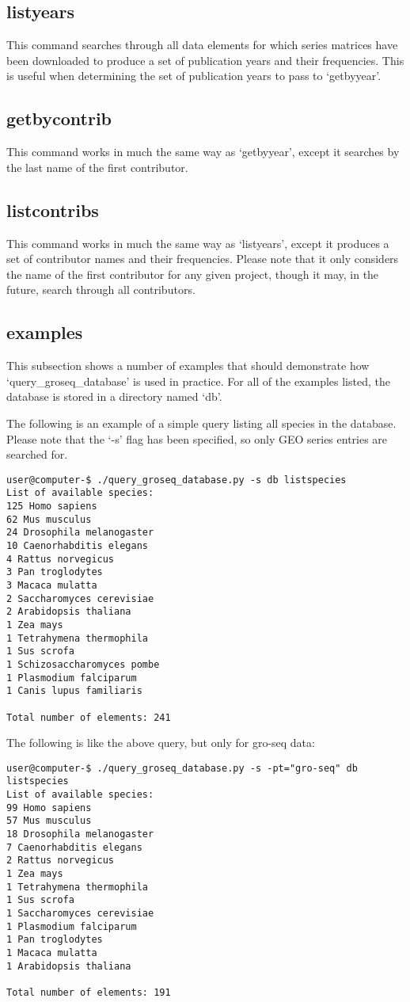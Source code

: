 \documentclass[12pt,letterpaper]{article}
\begin{document}
\subsection{listyears}
This command searches through all data elements for which series matrices have been downloaded to produce a set of publication years and their frequencies. 
This is useful when determining the set of publication years to pass to `getbyyear'.

\subsection{getbycontrib}
This command works in much the same way as `getbyyear', except it searches by the last name of the first contributor.

\subsection{listcontribs}
This command works in much the same way as `listyears', except it produces a set of contributor names and their frequencies. Please note that it only considers
the name of the first contributor for any given project, though it may, in the future, search through all contributors.

\subsection{examples}
This subsection shows a number of examples that should demonstrate how `query\_groseq\_database' is used in practice.
For all of the examples listed, the database is stored in a directory named `db'.

The following is an example of a simple query listing all species in the database. Please note that the `-s' flag has been specified, so
only GEO series entries are searched for.
\begin{verbatim}
user@computer-$ ./query_groseq_database.py -s db listspecies
List of available species:
125 Homo sapiens
62 Mus musculus
24 Drosophila melanogaster
10 Caenorhabditis elegans
4 Rattus norvegicus
3 Pan troglodytes
3 Macaca mulatta
2 Saccharomyces cerevisiae
2 Arabidopsis thaliana
1 Zea mays
1 Tetrahymena thermophila
1 Sus scrofa
1 Schizosaccharomyces pombe
1 Plasmodium falciparum
1 Canis lupus familiaris

Total number of elements: 241
\end{verbatim}

The following is like the above query, but only for gro-seq data:
\begin{verbatim}
user@computer-$ ./query_groseq_database.py -s -pt="gro-seq" db listspecies
List of available species:
99 Homo sapiens
57 Mus musculus
18 Drosophila melanogaster
7 Caenorhabditis elegans
2 Rattus norvegicus
1 Zea mays
1 Tetrahymena thermophila
1 Sus scrofa
1 Saccharomyces cerevisiae
1 Plasmodium falciparum
1 Pan troglodytes
1 Macaca mulatta
1 Arabidopsis thaliana

Total number of elements: 191
\end{verbatim}
\end{document}
